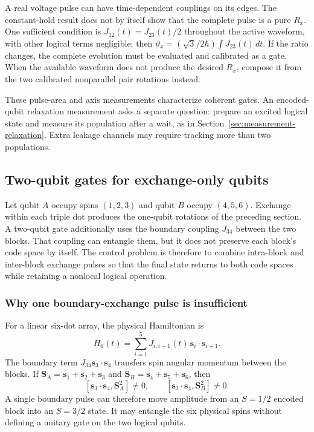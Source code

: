 A real voltage pulse can have time-dependent couplings on its
edges. The constant-hold result does not by itself show that the
complete pulse is a pure $R_x$. One sufficient condition is
$J_{12}(t)=J_{23}(t)/2$ throughout the active waveform, with
other logical terms negligible; then
$\vartheta_x=(\sqrt3/2\hbar)\int J_{23}(t)\,dt$.
If the ratio changes, the complete evolution must be evaluated
and calibrated as a gate. When the available waveform does not
produce the desired $R_x$, compose it from the two calibrated
nonparallel pair rotations instead.

These pulse-area and axis measurements characterize coherent gates.
An encoded-qubit relaxation measurement asks a separate question:
prepare an excited logical state and measure its population after
a wait, as in Section~\ref{sec:measurement-relaxation}. Extra
leakage channels may require tracking more than two populations.

\subsection{Two-qubit gates for exchange-only qubits}
\label{sec:calibration-eo-two-qubit-gates}

Let qubit $A$ occupy spins $(1,2,3)$ and qubit $B$ occupy
$(4,5,6)$. Exchange within each triple dot produces the one-qubit
rotations of the preceding section. A two-qubit gate additionally
uses the boundary coupling $J_{34}$ between the two blocks. That
coupling can entangle them, but it does not preserve each block's
code space by itself. The control problem is therefore to combine
intra-block and inter-block exchange pulses so that the final state
returns to both code spaces while retaining a nonlocal logical
operation.

\subsubsection{Why one boundary-exchange pulse is insufficient}

For a linear six-dot array, the physical Hamiltonian is
\begin{equation}
 H_6(t)=\sum_{i=1}^{5}J_{i,i+1}(t)\,
                     \mathbf s_i\cdot\mathbf s_{i+1}.
 \label{eq:calibration-six-spin-hamiltonian}
\end{equation}
The boundary term $J_{34}\mathbf s_3\cdot\mathbf s_4$ transfers
spin angular momentum between the blocks. If
$\mathbf S_A=\mathbf s_1+\mathbf s_2+\mathbf s_3$ and
$\mathbf S_B=\mathbf s_4+\mathbf s_5+\mathbf s_6$, then
\[
 [\mathbf s_3\cdot\mathbf s_4,\mathbf S_A^2]\ne0,
 \qquad
 [\mathbf s_3\cdot\mathbf s_4,\mathbf S_B^2]\ne0.
\]
A single boundary pulse can therefore move amplitude from an
$S=1/2$ encoded block into an $S=3/2$ state. It may entangle the
six physical spins without defining a unitary gate on the two
logical qubits.

